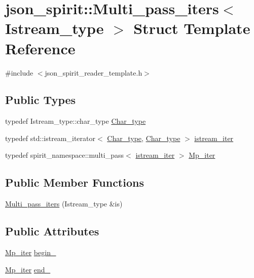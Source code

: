 \hypertarget{structjson__spirit_1_1_multi__pass__iters}{}\section{json\+\_\+spirit\+:\+:Multi\+\_\+pass\+\_\+iters$<$ Istream\+\_\+type $>$ Struct Template Reference}
\label{structjson__spirit_1_1_multi__pass__iters}


{\ttfamily \#include $<$json\+\_\+spirit\+\_\+reader\+\_\+template.\+h$>$}

\subsection*{Public Types}
\begin{DoxyCompactItemize}
\item 
typedef Istream\+\_\+type\+::char\+\_\+type \hyperlink{structjson__spirit_1_1_multi__pass__iters_af055928abdd9390a2c64285222b31fc6}{Char\+\_\+type}
\item 
typedef std\+::istream\+\_\+iterator$<$ \hyperlink{structjson__spirit_1_1_multi__pass__iters_af055928abdd9390a2c64285222b31fc6}{Char\+\_\+type}, \hyperlink{structjson__spirit_1_1_multi__pass__iters_af055928abdd9390a2c64285222b31fc6}{Char\+\_\+type} $>$ \hyperlink{structjson__spirit_1_1_multi__pass__iters_a93811375311c40a51de7669845cf3bc6}{istream\+\_\+iter}
\item 
typedef spirit\+\_\+namespace\+::multi\+\_\+pass$<$ \hyperlink{structjson__spirit_1_1_multi__pass__iters_a93811375311c40a51de7669845cf3bc6}{istream\+\_\+iter} $>$ \hyperlink{structjson__spirit_1_1_multi__pass__iters_ad2a62bae930a5705b96297264898c7e4}{Mp\+\_\+iter}
\end{DoxyCompactItemize}
\subsection*{Public Member Functions}
\begin{DoxyCompactItemize}
\item 
\hyperlink{structjson__spirit_1_1_multi__pass__iters_ad7fb4957b367a29e848239936f6387e1}{Multi\+\_\+pass\+\_\+iters} (Istream\+\_\+type \&is)
\end{DoxyCompactItemize}
\subsection*{Public Attributes}
\begin{DoxyCompactItemize}
\item 
\hyperlink{structjson__spirit_1_1_multi__pass__iters_ad2a62bae930a5705b96297264898c7e4}{Mp\+\_\+iter} \hyperlink{structjson__spirit_1_1_multi__pass__iters_a529ba1f47c74054bff695c277ec3b3b4}{begin\+\_\+}
\item 
\hyperlink{structjson__spirit_1_1_multi__pass__iters_ad2a62bae930a5705b96297264898c7e4}{Mp\+\_\+iter} \hyperlink{structjson__spirit_1_1_multi__pass__iters_afd43bdc90a846d2caa93846a069f9cbe}{end\+\_\+}
\end{DoxyCompactItemize}


